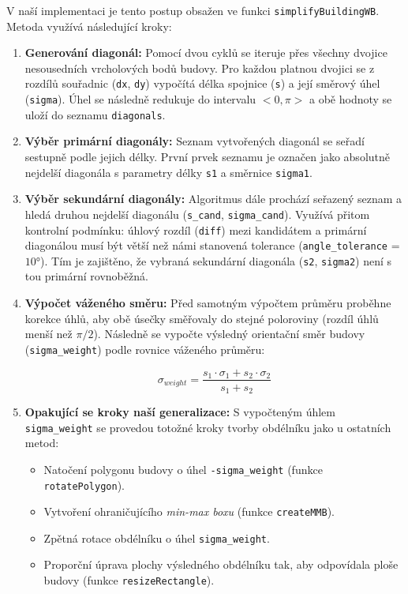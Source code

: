 \documentclass[12pt, a4paper]{article}
\begin{document}
V naší implementaci je tento postup obsažen ve funkci \texttt{simplifyBuildingWB}. Metoda využívá následující kroky:

\begin{enumerate}
    \item \textbf{Generování diagonál:} Pomocí dvou cyklů se iteruje přes všechny dvojice nesousedních vrcholových bodů budovy. Pro každou platnou dvojici se z rozdílů souřadnic (\texttt{dx}, \texttt{dy}) vypočítá délka spojnice (\texttt{s}) a její směrový úhel (\texttt{sigma}). Úhel se následně redukuje do intervalu $<0, \pi>$ a obě hodnoty se uloží do seznamu \texttt{diagonals}.
    \item \textbf{Výběr primární diagonály:} Seznam vytvořených diagonál se seřadí sestupně podle jejich délky. První prvek seznamu je označen jako absolutně nejdelší diagonála s parametry délky \texttt{s1} a směrnice \texttt{sigma1}.
    \item \textbf{Výběr sekundární diagonály:} Algoritmus dále prochází seřazený seznam a hledá druhou nejdelší diagonálu (\texttt{s\_cand}, \texttt{sigma\_cand}). Využívá přitom kontrolní podmínku: úhlový rozdíl (\texttt{diff}) mezi kandidátem a primární diagonálou musí být větší než námi stanovená tolerance (\texttt{angle\_tolerance} = $10°$). Tím je zajištěno, že vybraná sekundární diagonála (\texttt{s2}, \texttt{sigma2}) není s tou primární rovnoběžná.
    \item \textbf{Výpočet váženého směru:} Před samotným výpočtem průměru proběhne korekce úhlů, aby obě úsečky směřovaly do stejné poloroviny (rozdíl úhlů menší než $\pi/2$). Následně se vypočte výsledný orientační směr budovy (\texttt{sigma\_weight}) podle rovnice váženého průměru: 
    
    $$\sigma_{weight} = \frac{s_1 \cdot \sigma_1 + s_2 \cdot \sigma_2}{s_1 + s_2}$$

    
    \item \textbf{Opakující se kroky naší generalizace:} S vypočteným úhlem \texttt{sigma\_weight} se provedou totožné kroky tvorby obdélníku jako u ostatních metod:
    \begin{itemize}
        \item Natočení polygonu budovy o úhel \texttt{-sigma\_weight} (funkce \texttt{rotatePolygon}).
        \item Vytvoření ohraničujícího \textit{min-max boxu} (funkce \texttt{createMMB}).
        \item Zpětná rotace obdélníku o úhel \texttt{sigma\_weight}.
        \item Proporční úprava plochy výsledného obdélníku tak, aby odpovídala ploše budovy (funkce \texttt{resizeRectangle}).
    \end{itemize}
\end{enumerate}
\end{document}
